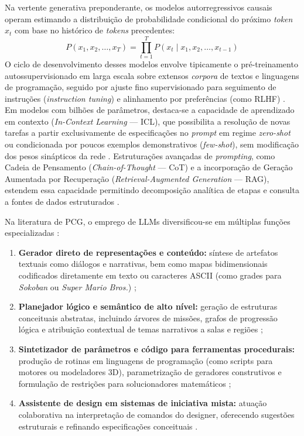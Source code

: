 Na vertente generativa preponderante, os modelos autorregressivos causais operam estimando a distribuição de probabilidade condicional do próximo \textit{token} $x_t$ com base no histórico de \textit{tokens} precedentes:
\begin{equation}
    P(x_1, x_2, \dots, x_T) = \prod_{t=1}^{T} P(x_t \mid x_1, x_2, \dots, x_{t-1})
\end{equation}
O ciclo de desenvolvimento desses modelos envolve tipicamente o pré-treinamento autossupervisionado em larga escala sobre extensos \textit{corpora} de textos e linguagens de programação, seguido por ajuste fino supervisionado para seguimento de instruções (\textit{instruction tuning}) e alinhamento por preferências (como RLHF) \cite{Gallotta_2024}. Em modelos com bilhões de parâmetros, destaca-se a capacidade de aprendizado em contexto (\textit{In-Context Learning} --- ICL), que possibilita a resolução de novas tarefas a partir exclusivamente de especificações no \textit{prompt} em regime \textit{zero-shot} ou condicionada por poucos exemplos demonstrativos (\textit{few-shot}), sem modificação dos pesos sinápticos da rede \cite{brown2020language}. Estruturações avançadas de \textit{prompting}, como Cadeia de Pensamento (\textit{Chain-of-Thought} --- CoT) e a incorporação de Geração Aumentada por Recuperação (\textit{Retrieval-Augmented Generation} --- RAG), estendem essa capacidade permitindo decomposição analítica de etapas e consulta a fontes de dados estruturados \cite{Gallotta_2024, tang2025unrealllm, wang2026designerlyloop}.

Na literatura de PCG, o emprego de LLMs diversificou-se em múltiplas funções especializadas \cite{Gallotta_2024, maleki2024procedural}:
\begin{enumerate}
    \item \textbf{Gerador direto de representações e conteúdo:} síntese de artefatos textuais como diálogos e narrativas, bem como mapas bidimensionais codificados diretamente em texto ou caracteres ASCII (como grades para \textit{Sokoban} ou \textit{Super Mario Bros.}) \cite{todd2023level, nasir2024word2worldgeneratingstoriesworlds};
    \item \textbf{Planejador lógico e semântico de alto nível:} geração de estruturas conceituais abstratas, incluindo árvores de missões, grafos de progressão lógica e atribuição contextual de temas narrativos a salas e regiões \cite{Gallotta_2024, xu2025databasedrivenframework3dlevel, wang2026designerlyloop};
    \item \textbf{Sintetizador de parâmetros e código para ferramentas procedurais:} produção de rotinas em linguagens de programação (como scripts para motores ou modeladores 3D), parametrização de geradores construtivos e formulação de restrições para solucionadores matemáticos \cite{hu2024scenecraft, tang2025unrealllm, xu2025constraint, yang2026codeasroomgenerating3drooms};
    \item \textbf{Assistente de design em sistemas de iniciativa mista:} atuação colaborativa na interpretação de comandos do designer, oferecendo sugestões estruturais e refinando especificações conceituais \cite{Gallotta_2024, bandeali2026generative, wang2026designerlyloop}.
\end{enumerate}


